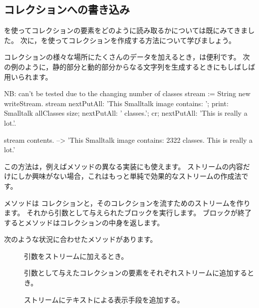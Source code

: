 \documentclass[a4paper,10pt,twoside]{book}
\begin{document}
\subsection{コレクションへの書き込み}

を使ってコレクションの要素をどのように読み取るかについては既にみてきました。
次に，を使ってコレクションを作成する方法について学びましょう。


コレクションの様々な場所にたくさんのデータを加えるとき，は便利です。
次の例のように，静的部分と動的部分からなる文字列を生成するときにもしばしば用いられます。


\begin{code}{NB: can't be tested due to the changing number of classes}
stream := String new writeStream.
stream
  nextPutAll: 'This Smalltalk image contains: ';
  print: Smalltalk allClasses size;
  nextPutAll: ' classes.';
  cr;
  nextPutAll: 'This is really a lot.'.

stream contents. --> 'This Smalltalk image contains: 2322 classes.
This is really a lot.'
\end{code}

この方法は，例えばメソッドの異なる実装にも使えます。
ストリームの内容だけにしか興味がない場合，これはもっと単純で効果的なストリームの作成法です。


 メソッドは
コレクションと，そのコレクションを流すためのストリームを作ります。
それから引数として与えられたブロックを実行します。
ブロックが終了するとメソッドはコレクションの中身を返します。

次のような状況に合わせたメソッドがあります。

\begin{description}
\item[] 引数をストリームに加えるとき。
\item[] 引数として与えたコレクションの要素をそれぞれストリームに追加するとき。
\item[] ストリームにテキストによる表示手段を追加する。
\end{description}
\end{document}

